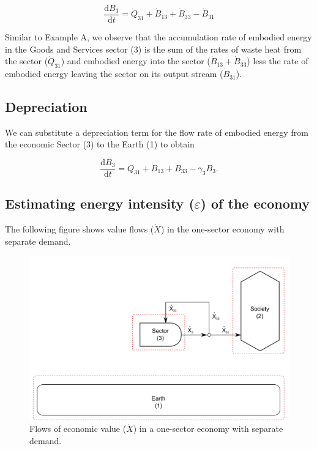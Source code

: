 \documentclass[authoryear,preprint,review,12pt]{elsarticle}
\begin{document}
\begin{equation} \label{eq:ExB_embodied_energy_accounting}
	\frac{\mathrm{d}B_3}{\mathrm{d}t} = \dot{Q}_{31} + \dot{B}_{13} + \dot{B}_{33} - \dot{B}_{31}
\end{equation}

Similar to Example A, we observe that the accumulation rate of embodied energy in the Goods and Services sector (3) is the sum of the rates of waste heat from the sector ($\dot{Q}_{31}$) and embodied energy into the sector ($\dot{B}_{13} + \dot{B}_{33}$) less the rate of embodied energy leaving the sector on its output stream ($\dot{B}_{31}$).

\subsection{Depreciation}

We can substitute a depreciation term for the flow rate of embodied energy from the economic Sector (3) to the Earth (1) to obtain

\begin{equation} \label{eq:ExB_embodied_energy_accounting_with_depreciation}
	\frac{\mathrm{d}B_3}{\mathrm{d}t} = \dot{Q}_{31} + \dot{B}_{13} + \dot{B}_{33} - \gamma_3 B_3.
\end{equation}

\subsection{Estimating energy intensity ($\varepsilon$) of the economy}

The following figure shows value flows ($\dot{X}$) in the one-sector economy with separate demand.

\begin{figure}[H]
\includegraphics[width=1.0\linewidth]{images/I-O_two_sector_value.pdf}
\caption{Flows of economic value ($\dot{X}$) in a one-sector economy with separate demand.}
\label{fig:economic_value_flows}
\end{figure}
\end{document}
